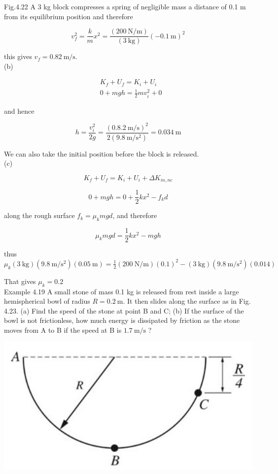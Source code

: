 \documentclass[10pt]{article}
\begin{document}
Fig.4.22 A 3 kg block compresses a spring of negligible mass a distance of 0.1 m from its equilibrium position and therefore

$$
v_{f}^{2}=\frac{k}{m} x^{2}=\frac{(200 \mathrm{~N} / \mathrm{m})}{(3 \mathrm{~kg})}(-0.1 \mathrm{~m})^{2}
$$

this gives $v_{f}=0.82 \mathrm{~m} / \mathrm{s}$.\\
(b)

$$
\begin{aligned}
& K_{f}+U_{f}=K_{i}+U_{i} \\
& 0+m g h=\frac{1}{2} m v_{i}^{2}+0
\end{aligned}
$$

and hence

$$
h=\frac{v_{i}^{2}}{2 g}=\frac{(0.8 .2 \mathrm{~m} / \mathrm{s})^{2}}{2\left(9.8 \mathrm{~m} / \mathrm{s}^{2}\right)}=0.034 \mathrm{~m}
$$

We can also take the initial position before the block is released.\\
(c)

$$
K_{f}+U_{f}=K_{i}+U_{i}+\Delta K_{i n, n c}
$$

$$
0+m g h=0+\frac{1}{2} k x^{2}-f_{k} d
$$

along the rough surface $f_{k}=\mu_{k} m g d$, and therefore

$$
\mu_{k} m g d=\frac{1}{2} k x^{2}-m g h
$$

thus\\
$\mu_{k}(3 \mathrm{~kg})\left(9.8 \mathrm{~m} / \mathrm{s}^{2}\right)(0.05 \mathrm{~m})=\frac{1}{2}(200 \mathrm{~N} / \mathrm{m})(0.1)^{2}-(3 \mathrm{~kg})\left(9.8 \mathrm{~m} / \mathrm{s}^{2}\right)(0.014)$

That gives $\mu_{k}=0.2$\\
Example 4.19 A small stone of mass 0.1 kg is released from rest inside a large hemispherical bowl of radius $R=0.2 \mathrm{~m}$. It then slides along the surface as in Fig. 4.23. (a) Find the speed of the stone at point B and C; (b) If the surface of the bowl is not frictionless, how much energy is dissipated by friction as the stone moves from A to B if the speed at B is $1.7 \mathrm{~m} / \mathrm{s}$ ?

\begin{center}
\includegraphics[max width=\textwidth]{2024_09_13_db1f357d2aad0a03eb2eg-075(1)}
\end{center}
\end{document}
